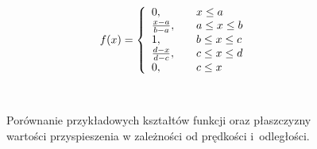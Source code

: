 \documentclass[11pt,a4paper]{article}
\begin{document}
\begin{equation}
f(x)=\left\{ 
  \begin{array}{l l}
    0, & \quad x\leq a\\
    \frac{x-a}{b-a}, &\quad a\leq x \leq b \\
    1, &\quad b\leq x \leq c \\
    \frac{d-x}{d-c}, &\quad c\leq x \leq d \\
    0, &\quad c\leq x\\
  \end{array} \right.
  \label{trapez}
\end{equation}

\begin{figure}
\label{img:fuzzy}
\centering
\mbox{
 \quad
{}
}
\mbox{
\quad
{} 
}
\caption{Porównanie przykładowych kształtów funkcji oraz płaszczyzny wartości przyspieszenia w zależności od prędkości i~odległości.}
\end{figure} 
\end{document}
